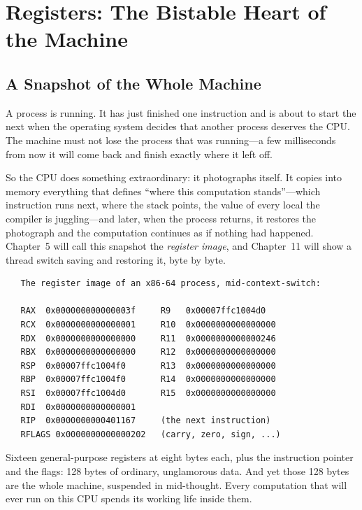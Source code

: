
\chapter{Registers: The Bistable Heart of the Machine}

\section{A Snapshot of the Whole Machine}

A process is running. It has just finished one instruction and is
about to start the next when the operating system decides that
another process deserves the CPU. The machine must not lose the
process that was running---a few milliseconds from now it will come
back and finish exactly where it left off.

So the CPU does something extraordinary: it photographs itself. It
copies into memory everything that defines ``where this computation
stands''---which instruction runs next, where the stack points, the
value of every local the compiler is juggling---and later, when the
process returns, it restores the photograph and the computation
continues as if nothing had happened. Chapter~5 will call this
snapshot the \emph{register image}, and Chapter~11 will show a thread
switch saving and restoring it, byte by byte.

\begin{verbatim}
   The register image of an x86-64 process, mid-context-switch:

   RAX  0x000000000000003f     R9   0x00007ffc1004d0
   RCX  0x0000000000000001     R10  0x0000000000000000
   RDX  0x0000000000000000     R11  0x0000000000000246
   RBX  0x0000000000000000     R12  0x0000000000000000
   RSP  0x00007ffc1004f0       R13  0x0000000000000000
   RBP  0x00007ffc1004f0       R14  0x0000000000000000
   RSI  0x00007ffc1004d0       R15  0x0000000000000000
   RDI  0x0000000000000001
   RIP  0x0000000000401167     (the next instruction)
   RFLAGS 0x0000000000000202   (carry, zero, sign, ...)
\end{verbatim}

Sixteen general-purpose registers at eight bytes each, plus the
instruction pointer and the flags: 128 bytes of ordinary, unglamorous
data. And yet those 128 bytes are the whole machine, suspended in
mid-thought. Every computation that will ever run on this CPU spends
its working life inside them.

